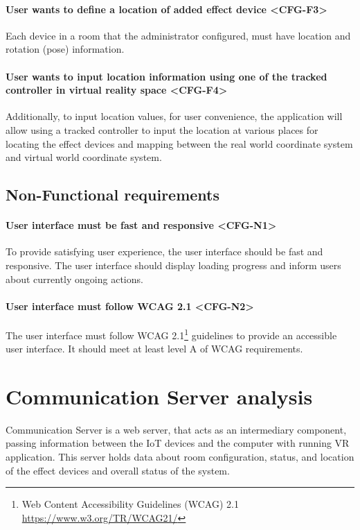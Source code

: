 \paragraph*{User wants to define a location of added effect device <CFG-F3>}
\label{cfg-f3}
Each device in a room that the administrator configured,
must have location and rotation (pose) information.


\paragraph*{User wants to input location information using one of the tracked controller in virtual reality space <CFG-F4>}
\label{cfg-f4}
Additionally, to input location values, for user convenience,
the application will allow using a tracked controller to input the location at
various places for locating the effect
devices and mapping between the real world coordinate system and virtual
world coordinate system.

\pagebreak

\subsection{Non-Functional requirements}

\paragraph*{User interface must be fast and responsive <CFG-N1>}
\label{cfg-n1}
To provide satisfying user experience, the user interface should be fast and
responsive. The user interface should display loading progress and inform users
about currently ongoing actions.


\paragraph*{User interface must follow WCAG 2.1 <CFG-N2>}
\label{cfg-n2}
The user interface must follow WCAG 2.1\footnote{Web Content Accessibility 
Guidelines (WCAG) 2.1 \href{https://www.w3.org/TR/WCAG21/}{https://www.w3.org/TR/WCAG21/}}
guidelines to provide an accessible user interface. It should meet at least
level A of WCAG requirements.


\section{Communication Server analysis}\label{analysis:server}

Communication Server is a web server, that acts as an intermediary component,
passing information between the IoT devices and the computer with
running VR application. This server holds data about room configuration,
status, and location of the effect devices and overall status of the system.

